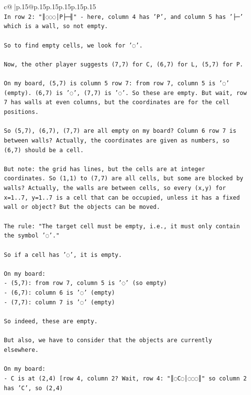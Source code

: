 \documentclass{article}
\begin{document}
{\begin{supertabular}{c@{$\;$}|p{.15\linewidth}@{}p{.15\linewidth}p{.15\linewidth}p{.15\linewidth}p{.15\linewidth}p{.15\linewidth}}
{{{\\ 
\texttt{In row 2: "║◌◌◌│P├─╢" {-} here, column 4 has 'P', and column 5 has '├─' which is a wall, so not empty.} \\
\\ 
\texttt{So to find empty cells, we look for '◌'.} \\
\\ 
\texttt{Now, the other player suggests (7,7) for C, (6,7) for L, (5,7) for P.} \\
\\ 
\texttt{On my board, (5,7) is column 5 row 7: from row 7, column 5 is '◌' (empty). (6,7) is '◌', (7,7) is '◌'. So these are empty. But wait, row 7 has walls at even columns, but the coordinates are for the cell positions.} \\
\\ 
\texttt{So (5,7), (6,7), (7,7) are all empty on my board? Column 6 row 7 is between walls? Actually, the coordinates are given as numbers, so (6,7) should be a cell.} \\
\\ 
\texttt{But note: the grid has lines, but the cells are at integer coordinates. So (1,1) to (7,7) are all cells, but some are blocked by walls? Actually, the walls are between cells, so every (x,y) for x=1..7, y=1..7 is a cell that can be occupied, unless it has a fixed wall or object? But the objects can be moved.} \\
\\ 
\texttt{The rule: "The target cell must be empty, i.e., it must only contain the symbol '◌'."} \\
\\ 
\texttt{So if a cell has '◌', it is empty.} \\
\\ 
\texttt{On my board:} \\
\texttt{{-} (5,7): from row 7, column 5 is '◌' (so empty)} \\
\texttt{{-} (6,7): column 6 is '◌' (empty)} \\
\texttt{{-} (7,7): column 7 is '◌' (empty)} \\
\\ 
\texttt{So indeed, these are empty.} \\
\\ 
\texttt{But also, we have to consider that the objects are currently elsewhere.} \\
\\ 
\texttt{On my board:} \\
\texttt{{-} C is at (2,4) {[}row 4, column 2? Wait, row 4: "║◌C◌│◌◌◌║" so column 2 has 'C', so (2,4)} \\
}}}
\end{supertabular}}
\end{document}

